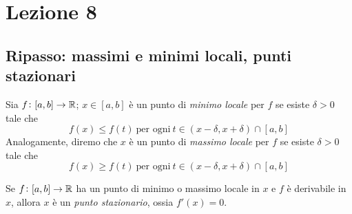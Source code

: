 \section{Lezione 8}
\subsection{Ripasso: massimi e minimi locali, punti stazionari}
\begin{definition}
    \label{def:7.1}
    Sia $f\colon[a,b]\to\amsbb{R}$; $x\in[a,b]$ è un punto di \emph{minimo locale} per $f$ se esiste $\delta>0$ tale che
    \[
    f(x)\le f(t) \ \text{per ogni} \ t\in(x-\delta, x+\delta)\cap [a,b]
    \]
    Analogamente, diremo che $x$ è un punto di \emph{massimo locale} per $f$ se esiste $\delta>0$ tale che
    \[
    f(x)\ge f(t) \ \text{per ogni} \ t\in(x-\delta, x+\delta)\cap [a,b]
    \]
\end{definition}
\begin{theorem}[di Fermat]
    \label{th:7.1}
    Se $f\colon [a,b]\to\amsbb{R}$ ha un punto di minimo o massimo locale in $x$ e $f$ è derivabile in $x$, allora $x$ è un \emph{punto stazionario}, ossia $f'(x) = 0$.
\end{theorem}
